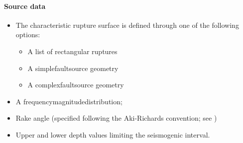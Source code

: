 \paragraph{Source data}
%
\begin{itemize}
\item The characteristic rupture surface is defined through one of the 
	following options:
	\begin{itemize}
		\item A list of rectangular ruptures 
		\item A \gls{simplefaultsource} geometry
		\item A \gls{complexfaultsource} geometry
	\end{itemize}
\item A \gls{frequencymagnitudedistribution};
\item Rake angle (specified following the Aki-Richards convention; 
see \citet{aki2002})
\item Upper and lower depth values limiting the seismogenic interval.
\end{itemize}
